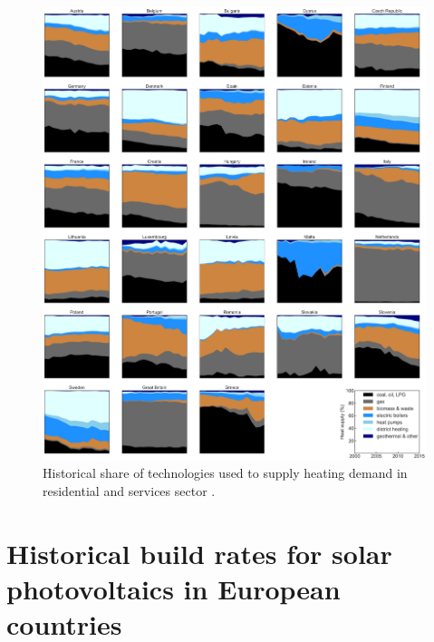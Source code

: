 \documentclass[3p]{elsarticle} %
\begin{document}
\begin{figure}[!h]
\centering
\includegraphics[width=\textwidth]{figures/heating_historical.png}
\caption{Historical share of technologies used to supply heating demand in residential and services sector \cite{IDEES}. } \label{fig_historical_heating} 
\end{figure}



\FloatBarrier

\section{Historical build rates for solar photovoltaics in European countries}
\end{document}
